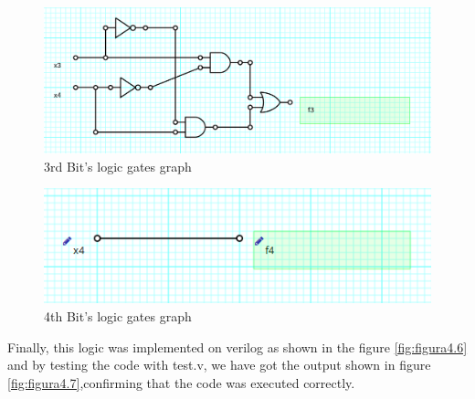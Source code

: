 \begin{figure}[h!] %
\begin{centering}
\includegraphics[scale=0.25]{../E4TP1/images/3}
\par\end{centering}
\caption{\color{cyan}3rd Bit's logic gates graph}
\label{fig:figura4.4}
\end{figure}

\begin{figure}[h!]%
\begin{centering}
\includegraphics[scale=0.25]{../E4TP1/images/4}
\par\end{centering}
\caption{\color{cyan}4th Bit's logic gates graph}
\label{fig:figura4.5}
\end{figure}

Finally, this logic was implemented on verilog as shown in the figure \ref{fig:figura4.6} and by testing the code
with test.v, we have got the output shown in figure \ref{fig:figura4.7},confirming that the code was executed
correctly.

